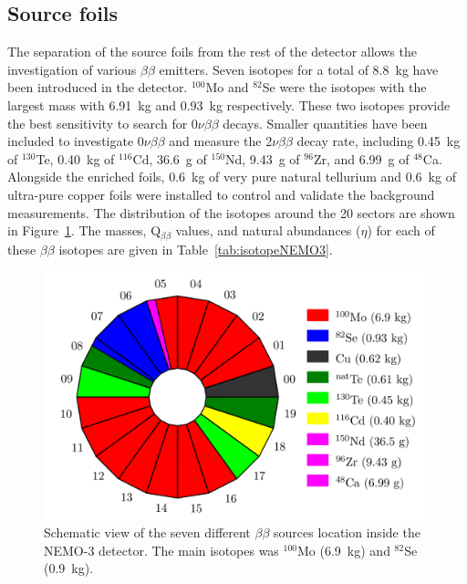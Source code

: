 \documentclass[main.tex]{subfiles}
\begin{document}
\FloatBarrier


\subsection{Source foils}


\NI The separation of the source foils from the rest of the detector allows the investigation of various $\beta\beta$ emitters. Seven isotopes for a total of 8.8~kg have been introduced in the detector. $^{\text{100}}$Mo and $^{\text{82}}$Se were the isotopes with the largest mass with 6.91~kg and 0.93~kg respectively. These two isotopes provide the best sensitivity to search for 0$\nu\beta\beta$ decays. Smaller quantities have been included to investigate 0$\nu\beta\beta$ and measure the 2$\nu\beta\beta$ decay rate, including 0.45~kg of $^{\text{130}}$Te, 0.40~kg of $^{\text{116}}$Cd, 36.6~g of $^{\text{150}}$Nd, 9.43~g of $^{\text{96}}$Zr, and 6.99~g of $^{\text{48}}$Ca. Alongside the enriched foils, 0.6~kg of very pure natural tellurium and 0.6~kg of ultra-pure copper foils were installed to control and validate the background measurements. The distribution of the isotopes around the 20 sectors are shown in Figure~\ref{NEMO3Sector}. The masses, Q$_{\beta\beta}$ values, and natural abundances ($\eta$) for each of these $\beta\beta$ isotopes are given in Table~\ref{tab:isotopeNEMO3}.



\begin{figure}[h!]
\begin{center}
\includegraphics[scale=0.5]{pictures/Chap3/BBSourceDistribution.png}
\caption{Schematic view of the seven different $\beta\beta$ sources location inside the NEMO-3 detector. The main isotopes was $^{\text{100}}$Mo (6.9~kg) and $^{\text{82}}$Se (0.9~kg).}
\label{NEMO3Sector}
\end{center}
\end{figure}
\end{document}

